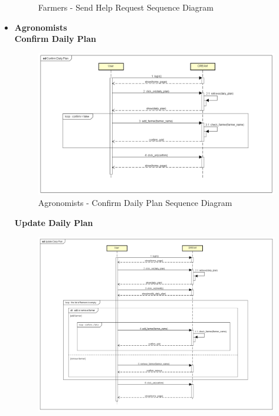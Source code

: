 \documentclass[table, 12pt]{article}
\begin{document}
\begin{itemize}
\begin{center}
\begin{figure}[H]
                    \caption{Farmers - Send Help Request Sequence Diagram}
                    \label{fig: sequence_helprequest}
                \end{figure}
            \end{center}

            \newpage
            \item \textbf{Agronomists}\\
            
            \textbf{Confirm Daily Plan}\\
            \begin{center}
                \begin{figure}[H]
                    \includegraphics[scale=0.55, center]{assets/Sequence diagrams/Agronomist/Confirm Daily Plan.png}
                    \caption{Agronomists - Confirm Daily Plan Sequence Diagram}
                    \label{fig: sdAgronomist_confirmDailyPlan}
                \end{figure}
            \end{center}
            \newpage
            \textbf{Update Daily Plan}\\
            \begin{center}
                \begin{figure}[H]
                    \includegraphics[scale=0.45, center]{assets/Sequence diagrams/Agronomist/Update Daily Plan.png}

\end{figure}
\end{center}
\end{itemize}
\end{document}
